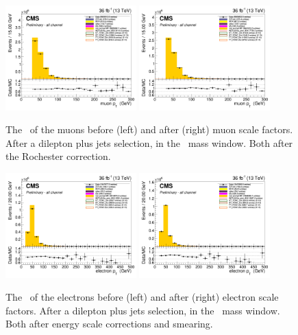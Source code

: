 \begin{figure}[htbp]
	\centering
	\includegraphics[width=0.45\textwidth]{5_Eventselection/Figures/Reweighing/muon/2lepcontrol_afterAtLeast1Jet_afterZWindow_MuPt_all_Stack_before}
	\includegraphics[width=0.45\textwidth]{5_Eventselection/Figures/Reweighing/muon/2lepcontrol_afterAtLeast1Jet_afterZWindow_MuPt_all_Stack_after}
	\caption{The \pt\ of the muons before (left) and after (right) muon scale factors. After a dilepton plus jets selection, in the \PZ\ mass window. Both after the Rochester correction.}
	\label{fig:muSF}
\end{figure}
\begin{figure}[htbp]
	\centering
	\includegraphics[width=0.45\textwidth]{5_Eventselection/Figures/Reweighing/electron/2lepcontrol_afterAtLeast1Jet_afterZWindow_ElPt_all_Stack_before}
	\includegraphics[width=0.45\textwidth]{5_Eventselection/Figures/Reweighing/electron/2lepcontrol_afterAtLeast1Jet_afterZWindow_ElPt_all_Stack_after}
	\caption{The \pt\ of the electrons before (left) and after (right) electron scale factors. After a dilepton plus jets selection, in the \PZ\ mass window. Both after energy scale corrections and smearing.}
	\label{fig:elSF}
\end{figure}

